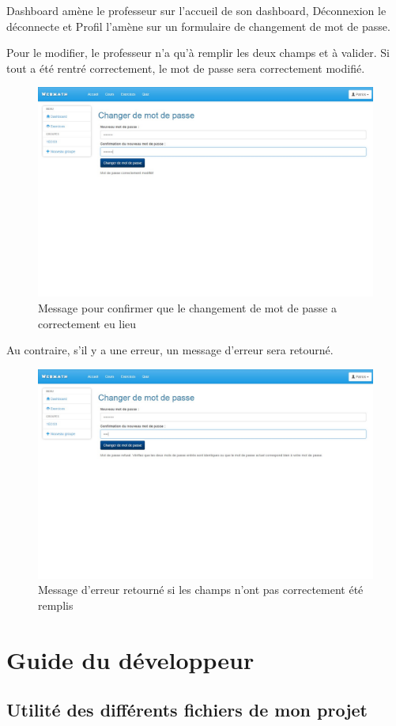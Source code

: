 \documentclass[letterpaper,10pt,french]{sphinxmanual}
\begin{document}
Dashboard amène le professeur sur l'accueil de son dashboard, Déconnexion le
déconnecte et Profil l'amène sur un formulaire de changement de mot de passe.

Pour le modifier, le professeur n'a qu'à remplir les deux champs et à valider.
Si tout a été rentré correctement, le mot de passe sera correctement modifié.
\begin{figure}[htbp]
\centering
\capstart

\includegraphics[width=0.600\linewidth]{passwordSuccess.jpg}
\caption{Message pour confirmer que le changement de mot de passe a correctement eu
lieu}\end{figure}

Au contraire, s'il y a une erreur, un message d'erreur sera retourné.
\begin{figure}[htbp]
\centering
\capstart

\includegraphics[width=0.600\linewidth]{passwordFail.jpg}
\caption{Message d'erreur retourné si les champs n'ont pas correctement été remplis}\end{figure}


\chapter{Guide du développeur}
\label{documentation:guide-du-developpeur}\label{documentation::doc}

\section{Utilité des différents fichiers de mon projet}
\label{documentation:utilite-des-differents-fichiers-de-mon-projet}
\end{document}
